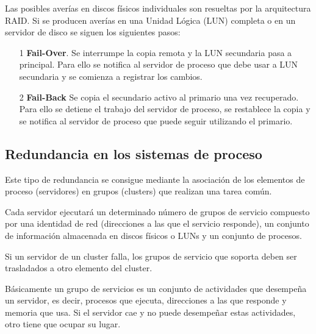 Las posibles averías en discos físicos individuales son resueltas por la arquitectura RAID. Si se producen averías en una Unidad Lógica (LUN) completa o en un servidor de disco se siguen los siguientes pasos:
\begin{enumerate}
\item[1] \textbf{Fail-Over}. Se interrumpe la copia remota y la LUN secundaria pasa a principal. Para ello se notifica al servidor de proceso que debe usar a LUN secundaria y se comienza a registrar los cambios.

\item[2] \textbf{Fail-Back} Se copia el secundario activo al primario una vez recuperado. Para ello se detiene el trabajo del servidor de proceso, se restablece la copia y se notifica al servidor de proceso que puede seguir utilizando el primario.
\end{enumerate}


\subsection{Redundancia en los sistemas de proceso}
Este tipo de redundancia se consigue mediante la asociación de los elementos de proceso (servidores) en grupos (clusters) que realizan una tarea común.

Cada servidor ejecutará un determinado número de grupos de servicio compuesto por una identidad de red (direcciones a las que el servicio responde), un conjunto de información almacenada en discos físicos o LUNs y un conjunto de procesos.

Si un servidor de un cluster falla, los grupos de servicio que soporta deben ser trasladados a otro elemento del cluster.

Básicamente un grupo de servicios es un conjunto de actividades que desempeña un servidor, es decir, procesos que ejecuta, direcciones a las que responde y memoria que usa. Si el servidor cae y no puede desempeñar estas actividades, otro tiene que ocupar su lugar.

